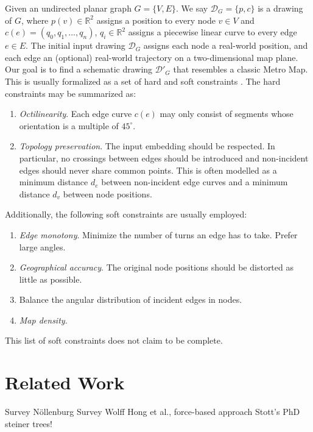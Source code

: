 \documentclass{sig-alternate-sigmod09}
\begin{document}
Given an undirected planar graph $G = \{V, E\}$. We say $\mathcal{D}_G = \{p, c\}$ is a drawing of $G$, where $p(v) \in \mathbb{R}^2$ assigns a position to every node $v \in V$ and $c(e) = (q_0, q_1, ..., q_n)$, $q_i \in \mathbb{R}^2$ assigns a piecewise linear curve to every edge $e \in E$. The initial input drawing $\mathcal{D}_G$ assigns each node a real-world position, and each edge an (optional) real-world trajectory on a two-dimensional map plane. Our goal is to find a schematic drawing $\mathcal{D}'_G$ that resembles a classic Metro Map. This is usually formalized as a set of hard and soft constraints \cite{nb, ...}. The hard constraints may be summarized as:
\begin{enumerate}
\setlength\itemsep{.1em}
\item \emph{Octilinearity}. Each edge curve $c(e)$ may only consist of segments whose orientation is a multiple of $45^{\circ}$.
\item \emph{Topology preservation}. The input embedding should be respected. In particular, no crossings between edges should be introduced and non-incident edges should never share common points. This is often modelled as a minimum distance $d_{e}$ between non-incident edge curves and a minimum distance $d_{v}$ between node positions.
\end{enumerate}
Additionally, the following soft constraints are usually employed:
\begin{enumerate}
\setlength\itemsep{.1em}
\item \emph{Edge monotony}. Minimize the number of turns an edge has to take. Prefer large angles.
\item \emph{Geographical accuracy}. The original node positions should be distorted as little as possible.
\item \emph{} Balance the angular distribution of incident edges in nodes.
\item \emph{Map density}.
\end{enumerate}

This list of soft constraints does not claim to be complete. %


\section{Related Work}

Survey Nöllenburg %
Survey Wolff %
Hong et al., force-based approach
Stott's PhD
steiner trees! %
\end{document}
